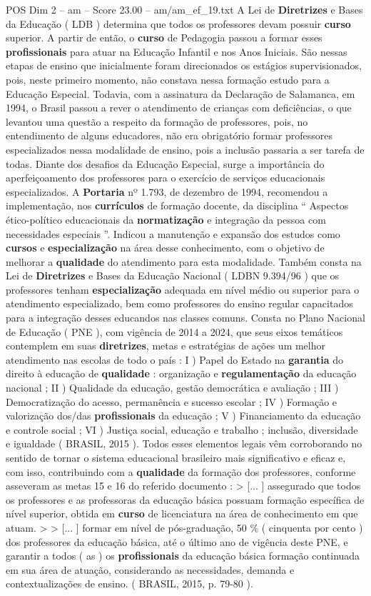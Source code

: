 \begin{textsample}{POS Dim 2 – am – Score 23.00 – am/am\_ef\_19.txt}
A Lei de \textbf{Diretrizes} e Bases da Educação ( LDB ) determina que todos os professores devam possuir \textbf{curso} superior.
A partir de então, o \textbf{curso} de Pedagogia passou a formar esses \textbf{profissionais} para atuar na Educação Infantil e nos Anos Iniciais.
São nessas etapas de ensino que inicialmente foram direcionados os estágios supervisionados, pois, neste primeiro momento, não constava nessa formação estudo para a Educação Especial.
Todavia, com a assinatura da Declaração de Salamanca, em 1994, o Brasil passou a rever o atendimento de crianças com deficiências, o que levantou uma questão a respeito da formação de professores, pois, no entendimento de alguns educadores, não era obrigatório formar professores especializados nessa modalidade de ensino, pois a inclusão passaria a ser tarefa de todas.
Diante dos desafios da Educação Especial, surge a importância do aperfeiçoamento dos professores para o exercício de serviços educacionais especializados.
A \textbf{Portaria} nº 1.793, de dezembro de 1994, recomendou a implementação, nos \textbf{currículos} de formação docente, da disciplina “ Aspectos ético-político educacionais da \textbf{normatização} e integração da pessoa com necessidades especiais ”.
Indicou a manutenção e expansão dos estudos como \textbf{cursos} e \textbf{especialização} na área desse conhecimento, com o objetivo de melhorar a \textbf{qualidade} do atendimento para esta modalidade.
Também consta na Lei de \textbf{Diretrizes} e Bases da Educação Nacional ( LDBN 9.394/96 ) que os professores tenham \textbf{especialização} adequada em nível médio ou superior para o atendimento especializado, bem como professores do ensino regular capacitados para a integração desses educandos nas classes comuns.
Consta no Plano Nacional de Educação ( PNE ), com vigência de 2014 a 2024, que seus eixos temáticos contemplem em suas \textbf{diretrizes}, metas e estratégias de ações um melhor atendimento nas escolas de todo o país : I ) Papel do Estado na \textbf{garantia} do direito à educação de \textbf{qualidade} : organização e \textbf{regulamentação} da educação nacional ; II ) Qualidade da educação, gestão democrática e avaliação ; III ) Democratização do acesso, permanência e sucesso escolar ; IV ) Formação e valorização dos/das \textbf{profissionais} da educação ; V ) Financiamento da educação e controle social ; VI ) Justiça social, educação e trabalho ; inclusão, diversidade e igualdade ( BRASIL, 2015 ).
Todos esses elementos legais vêm corroborando no sentido de tornar o sistema educacional brasileiro mais significativo e eficaz e, com isso, contribuindo com a \textbf{qualidade} da formação dos professores, conforme asseveram as metas 15 e 16 do referido documento : > [... ] assegurado que todos os professores e as professoras da educação básica possuam formação específica de nível superior, obtida em \textbf{curso} de licenciatura na área de conhecimento em que atuam. > > [... ] formar em nível de pós-graduação, 50 \% ( cinquenta por cento ) dos professores da educação básica, até o último ano de vigência deste PNE, e garantir a todos ( as ) os \textbf{profissionais} da educação básica formação continuada em sua área de atuação, considerando as necessidades, demanda e contextualizações de ensino. ( BRASIL, 2015, p. 79-80 ).

\end{textsample}
